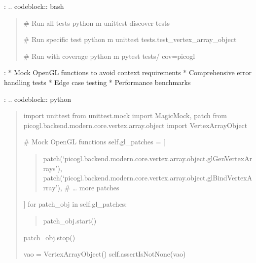 \documentclass[a4paper,10pt,english,openany,oneside]{sphinxmanual}
\begin{document}
\sphinxAtStartPar
{}:
.. code\sphinxhyphen{}block:: bash
\begin{quote}

\sphinxAtStartPar
\# Run all tests
python \sphinxhyphen{}m unittest discover tests

\sphinxAtStartPar
\# Run specific test
python \sphinxhyphen{}m unittest tests.test\_vertex\_array\_object

\sphinxAtStartPar
\# Run with coverage
python \sphinxhyphen{}m pytest tests/ \textendash{}cov=picogl
\end{quote}

\sphinxAtStartPar
{}:
* Mock OpenGL functions to avoid context requirements
* Comprehensive error handling tests
* Edge case testing
* Performance benchmarks

\sphinxAtStartPar
{}:
.. code\sphinxhyphen{}block:: python
\begin{quote}

\sphinxAtStartPar
import unittest
from unittest.mock import MagicMock, patch
from picogl.backend.modern.core.vertex.array.object import VertexArrayObject
\begin{description}
\begin{description}
\sphinxAtStartPar
\# Mock OpenGL functions
self.gl\_patches = {[}
\begin{quote}

\sphinxAtStartPar
patch(‘picogl.backend.modern.core.vertex.array.object.glGenVertexArrays’),
patch(‘picogl.backend.modern.core.vertex.array.object.glBindVertexArray’),
\# … more patches
\end{quote}

\sphinxAtStartPar
{]}
for patch\_obj in self.gl\_patches:
\begin{quote}

\sphinxAtStartPar
patch\_obj.start()
\end{quote}

\begin{description}
\sphinxAtStartPar
patch\_obj.stop()

\end{description}

\sphinxAtStartPar
vao = VertexArrayObject()
self.assertIsNotNone(vao)

\end{description}

\end{description}
\end{quote}
\end{document}
